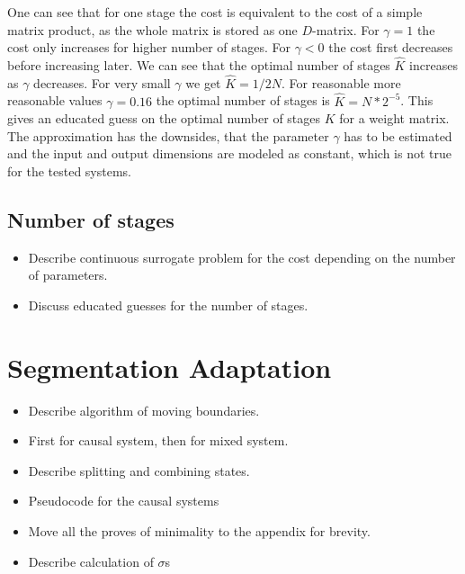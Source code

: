 \documentclass[doctype=mastersthesis,BCOR=15mm,biblatex]{ldvbook}%
\begin{document}
One can see that for one stage the cost is equivalent to the cost of a simple matrix product, as the whole matrix is stored as one $D$-matrix.
For $\gamma = 1$ the cost only increases for higher number of stages. 
For $\gamma < 0$ the cost first decreases before increasing later.
We can see that the optimal number of stages $\hat{K}$ increases as $\gamma$ decreases.
For very small $\gamma$ we get $\hat{K} = 1/2 N$.
For reasonable more reasonable values $\gamma=0.16$ the optimal number of stages is $\hat{K}=N*2^{-5}$. 
This gives an educated guess on the optimal number of stages $K$ for a weight matrix.
The approximation has the downsides, that the parameter $\gamma$ has to be estimated
and the input and output dimensions are modeled as constant, which is not true for the tested systems.


\subsection{Number of stages}
\begin{itemize}
\item Describe continuous surrogate problem for the cost depending on the number of parameters. 
\item Discuss educated guesses for the number of stages.
\end{itemize}

\section{Segmentation Adaptation}
\begin{itemize}
\item Describe algorithm of moving boundaries.
\item First for causal system, then for mixed system.

\item Describe splitting and combining states.

\item Pseudocode for the causal systems

\item Move all the proves of minimality to the appendix for brevity.
\item Describe calculation of $\sigma$s
\end{itemize}
\end{document}

